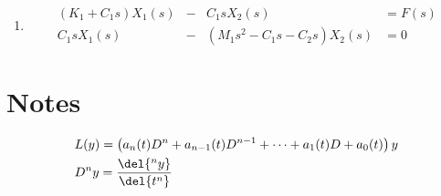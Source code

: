 \documentclass[main.tex]{subfiles}
\begin{document}
\begin{enumerate}
\begin{enumerate}
\begin{align*}
{						}{\Delta} 
					\right| \Delta =
					\begin{vmatrix}
							-R_1-R_2 & R_2
							\\R_1 & -R_2-Ls-\frac{1}{Cs}
					\end{vmatrix}
				\end{align*}
				\begin{align*}
					V_o &= i_2(s)\frac{1}{Cs}
					\\  &= (\frac{-V_iR_1}{\Delta})\frac{1}{Cs}
					\\\therefore \boxed{\frac{V_o}{V_i} = \frac{-R_1}{\Delta Cs}}
				\end{align*}
		\end{enumerate}
	\setcounter{enumi}{24}
  \item
    \begin{minipage}{\textwidth}
      \vspace{0pt}
    \end{minipage}
    \begin{align*}
        (K_1+C_1s)X_1(s)&-&C_1sX_2(s) &= F(s)
      \\C_1sX_1(s)&-&(M_1s^2-C_1s-C_2s)X_2(s) &= 0
    \end{align*}
\end{enumerate}

\section*{Notes} 
\label{sec:notes}
	\begin{align*}
		  & L(y) = \left(a_n(t)D^n + a_{n-1}(t)D^{n-1} + \cdots + a_1(t)D + a_0(t) \right)y
		\\& D^{n}y = \frac{\del{^ny}}{\del{t^n}}
	\end{align*}
\end{document}
